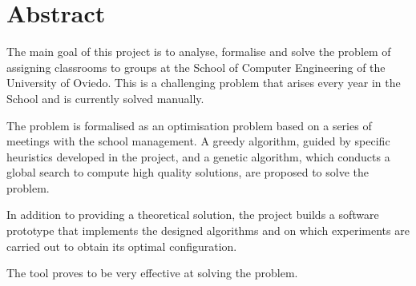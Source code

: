 
\chapter*{Abstract}

The main goal of this project is to analyse, formalise and solve the problem of assigning classrooms to groups at the School of Computer Engineering of the University of Oviedo. This is a challenging problem that arises every year in the School and is currently solved manually.

The problem is formalised as an optimisation problem based on a series of meetings with the school management. A greedy algorithm, guided by specific heuristics developed in the project, and a genetic algorithm, which conducts a global search to compute high quality solutions, are proposed to solve the problem.

In addition to providing a theoretical solution, the project builds a software prototype that implements the designed algorithms and on which experiments are carried out to obtain its optimal configuration.

The tool proves to be very effective at solving the problem.

